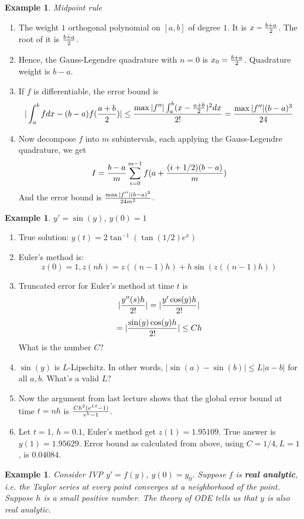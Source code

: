 \documentclass[20pt]{article} %
\theoremstyle{break}
\newtheorem{exa}[definition]{Example}
\begin{document}
\begin{exa}Midpoint rule\end{exa}
\begin{enumerate}
\item The weight $1$ orthogonal polynomial on $[a, b]$ of degree $1$. It is $x-{b+a\over 2}$. The root of it is ${b+a\over 2}$.
\item Hence, the Gauss-Legendre quadrature with $n=0$ is $x_0={b+a\over 2}$. Quadrature weight is ${b-a}$.
\item If $f$ is differentiable, the error bound is
  \[|\int_a^bfdx-{(b-a)}f({a+b\over 2})|\leq {\max|f''|\int_a^b(x-{a+b\over 2})^2dx\over 2!}={\max|f''|(b-a)^3\over 24}\]
\item Now decompose $f$ into $m$ subintervals, each applying the Gauss-Legendre quadrature, we get
  \[I={b-a\over m}\sum_{i=0}^{m-1} f(a+{(i+1/2)(b-a)\over m})\]
  And the error bound is $\max|f''|(b-a)^3\over 24m^2$.
\end{enumerate}

\newpage

\begin{exa} $y'=\sin(y)$, $y(0)=1$\end{exa}
\begin{enumerate}
\item True solution: $y(t)=2\tan^{-1}(\tan(1/2)e^x)$\\
\item Euler's method is:
\[z(0)=1, z(nh)=z((n-1)h)+h\sin(z((n-1)h))\]
\item Truncated error for Euler's method at time $t$ is
  \[|{y''(s)h\over 2!}|=|{y'\cos(y)h\over 2!}|\]
  \[=|{\sin(y)\cos(y)h\over 2!}|\leq Ch\]
  What is the number $C$?
\item $\sin(y)$ is $L$-Lipschitz. In other words, $|\sin(a)-\sin(b)|\leq L|a-b|$ for all $a, b$. What's a valid $L$?
\item Now the argument from last lecture shows that the global error bound at time $t=nh$ is ${Ch^2(e^{Lt}-1)\over e^h-1}$. 
\item Let $t=1$, $h=0.1$, Euler's method get $z(1)=1.95109$. True answer is $y(1)=1.95629$. Error bound as calculated from above, using $C=1/4, L=1$, is $0.04084$.
\end{enumerate}


\newpage

\begin{exa}Consider IVP $y'=f(y)$, $y(0)=y_0$. Suppose $f$ is {\bf real analytic}, i.e. the Taylor series at every point converges at a neighborhood of the point. Suppose $h$ is a small positive number. The theory of ODE tells us that $y$ is also real analytic.\end{exa}
\end{document}
